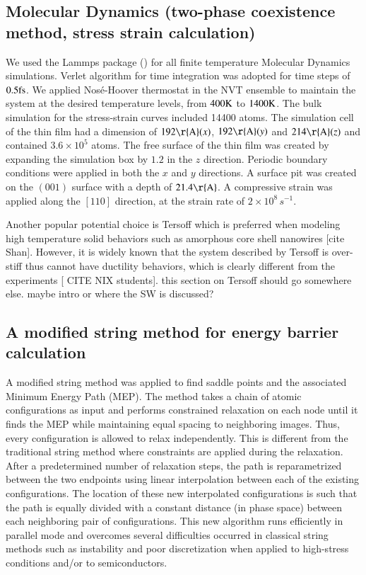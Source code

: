 \documentclass[review]{elsarticle}
\begin{document}
\subsection{Molecular Dynamics (two-phase coexistence method, stress strain calculation)}\label{sec:md}
We used the Lammps package (\cite{plimpton1995fast}) for all finite temperature Molecular Dynamics simulations.  Verlet algorithm for time integration was adopted for time steps of $0.5 {\rm fs}$. We applied Nos{\'e}-Hoover thermostat in the NVT ensemble to maintain the system at the desired temperature levels, from $400{\rm K}$ to $1400 {\rm K}$. The bulk simulation for the stress-strain curves included 14400 atoms. The simulation cell of the thin film had a dimension of $192 {\rm \r{A}} (x)$, $192{\rm \r{A}} (y)$ and $214{\rm \r{A}} (z)$ and contained $3.6\times 10^5$ atoms. The free surface of the thin film was created by expanding the simulation box by $1.2$ in the $z$ direction. Periodic boundary conditions were applied in both the $x$ and $y$ directions. A surface pit was created on the $(001)$ surface with a depth of $21.4{\rm \r{A}}$. A compressive strain was applied along the $[110]$ direction, at the strain rate of $2\times 10^8 \, s^{-1}$.  

Another popular potential choice is Tersoff which is preferred when modeling high temperature solid behaviors such as amorphous core shell nanowires [cite Shan]. However, it is widely known that the system described by Tersoff is over-stiff thus cannot have ductility behaviors, which is clearly different from the experiments [{\color{red} CITE NIX students}]. {\color{red} this section on Tersoff should go somewhere else. maybe intro or where the SW is discussed?}

\subsection{A modified string method for energy barrier calculation}\label{sec:neb}
A modified string method was applied to find saddle points and the associated Minimum Energy Path (MEP). The method takes a chain of atomic configurations as input and performs constrained relaxation on each node until it finds the MEP while maintaining equal spacing to neighboring images. Thus, every configuration is allowed to relax independently. This is different from the traditional string method where constraints are applied during the relaxation. After a predetermined number of relaxation steps, the path is reparametrized between the two endpoints using linear interpolation between each of the existing configurations. The location of these new interpolated configurations is such that the path is equally divided with a constant distance (in phase space) between each neighboring pair of configurations.  This new algorithm runs efficiently in parallel mode and overcomes several difficulties occurred in classical string methods such as instability and poor discretization when applied to high-stress conditions and/or to semiconductors.
\end{document}
